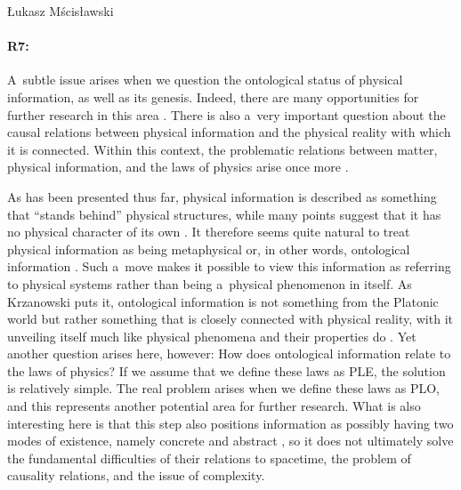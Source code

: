 \begin{artengenv}{Łukasz Mścisławski}
\paragraph{R7:} A~subtle issue arises when we question the ontological status of physical information, as well as its genesis. Indeed, there are many opportunities for further research in this area
\parencite[cf.][p.13]{krzanowski_what_2020}. %
 There is also a~very important question about the causal relations between physical information and the physical reality with which it is connected. Within this context, the problematic relations between matter, physical information, and the laws of physics arise once more 
\parencite[e.g.,][]{davies_implications_2007}.%


As has been presented thus far, physical information is described as something that ``stands behind'' physical structures, while many points suggest that it has no physical character of its own
\parencite[see also][]{burgin_general_2017}. %
 It therefore seems quite natural to treat physical information as being metaphysical or, in other words, ontological information 
\parencites[cf.][]{krzanowski_what_2020}[][]{krzanowski_ontological_2022}. %
 Such a~move makes it possible to view this information as referring to physical systems rather than being a~physical phenomenon in itself. As Krzanowski puts it, ontological information is not something from the Platonic world but rather something that is closely connected with physical reality, with it unveiling itself much like physical phenomena and their properties do 
\parencite[cf.][p.110]{krzanowski_ontological_2022}. %
 Yet another question arises here, however: How does ontological information relate to the laws of physics? If we assume that we define these laws as PLE, the solution is relatively simple. The real problem arises when we define these laws as PLO, and this represents another potential area for further research. What is also interesting here is that this step also positions information as possibly having two modes of existence, namely concrete and abstract 
\parencite[][pp.154]{krzanowski_ontological_2022}, %
 so it does not ultimately solve the fundamental difficulties of their relations to spacetime, the problem of causality relations, and the issue of complexity.


\end{artengenv}
